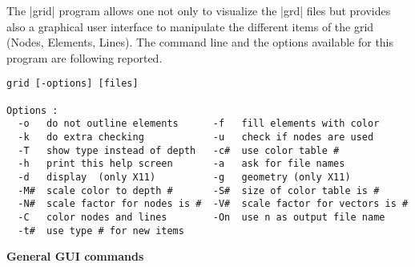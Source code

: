 
%
%
%
%
%
%
%

The |grid| program allows one not only to visualize 
the |grd| files but provides also a graphical user interface 
to manipulate the different items of the grid (Nodes, Elements, Lines).
The command line and the options available for this program are following reported.

\begin{verbatim}
grid [-options] [files] 

Options :
  -o   do not outline elements      -f   fill elements with color     
  -k   do extra checking            -u   check if nodes are used      
  -T   show type instead of depth   -c#  use color table #            
  -h   print this help screen       -a   ask for file names           
  -d   display  (only X11)          -g   geometry (only X11)          
  -M#  scale color to depth #       -S#  size of color table is #     
  -N#  scale factor for nodes is #  -V#  scale factor for vectors is #
  -C   color nodes and lines        -On  use n as output file name    
  -t#  use type # for new items
\end{verbatim}

\textbf{General GUI commands}

\par
{}
\par
{}
\par
{}
\par
{}
\par

